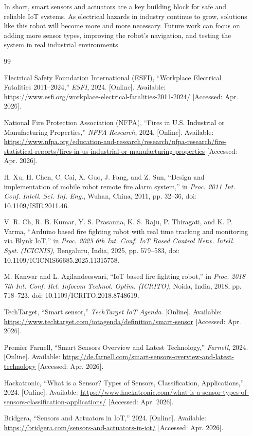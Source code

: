 \documentclass[conference]{IEEEtran}
\begin{document}
In short, smart sensors and actuators are a key building block for safe and reliable IoT systems. As electrical hazards in industry continue to grow, solutions like this robot will become more and more necessary. Future work can focus on adding more sensor types, improving the robot's navigation, and testing the system in real industrial environments.


\begin{thebibliography}{99}

Electrical Safety Foundation International (ESFI), ``Workplace
Electrical Fatalities 2011--2024,''
\textit{ESFI}, 2024. [Online]. Available:
\url{https://www.esfi.org/workplace-electrical-fatalities-2011-2024/}
[Accessed: Apr. 2026].

National Fire Protection Association (NFPA), ``Fires in U.S.
Industrial or Manufacturing Properties,''
\textit{NFPA Research}, 2024. [Online]. Available:
\url{https://www.nfpa.org/education-and-research/research/nfpa-research/fire-statistical-reports/fires-in-us-industrial-or-manufacturing-properties}
[Accessed: Apr. 2026].

H. Xu, H. Chen, C. Cai, X. Guo, J. Fang, and Z. Sun, ``Design and
implementation of mobile robot remote fire alarm system,''
in \textit{Proc. 2011 Int. Conf. Intell. Sci. Inf. Eng.}, Wuhan, China, 2011,
pp. 32--36, doi: 10.1109/ISIE.2011.46.

V. R. Ch, R. B. Kumar, Y. S. Prasanna, K. S. Raju, P. Thiragati, and
K. P. Varma, ``Arduino based fire fighting robot with real time
tracking and monitoring via Blynk IoT,''
in \textit{Proc. 2025 6th Int. Conf. IoT Based Control Netw. Intell. Syst. (ICICNIS)},
Bengaluru, India, 2025, pp. 579--583, doi: 10.1109/ICICNIS66685.2025.11315758.

M. Kanwar and L. Agilandeeswari, ``IoT based fire fighting robot,''
in \textit{Proc. 2018 7th Int. Conf. Rel. Infocom Technol. Optim. (ICRITO)},
Noida, India, 2018, pp. 718--723, doi: 10.1109/ICRITO.2018.8748619.

TechTarget, ``Smart sensor,'' \textit{TechTarget IoT Agenda}. [Online]. Available:
\url{https://www.techtarget.com/iotagenda/definition/smart-sensor}
[Accessed: Apr. 2026].

Premier Farnell, ``Smart Sensors Overview and Latest Technology,''
\textit{Farnell}, 2024. [Online]. Available:
\url{https://de.farnell.com/smart-sensors-overview-and-latest-technology}
[Accessed: Apr. 2026].

Hackatronic, ``What is a Sensor? Types of Sensors, Classification,
Applications,'' 2024. [Online]. Available:
\url{https://www.hackatronic.com/what-is-a-sensor-types-of-sensors-classification-applications/}
[Accessed: Apr. 2026].

Bridgera, ``Sensors and Actuators in IoT,'' 2024. [Online]. Available:
\url{https://bridgera.com/sensors-and-actuators-in-iot/}
[Accessed: Apr. 2026].

\end{thebibliography}
\end{document}

